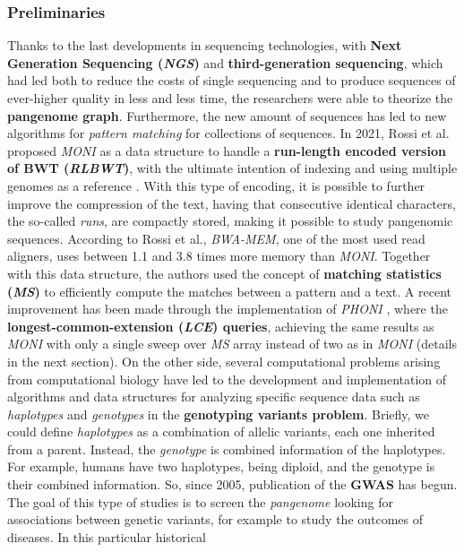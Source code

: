\documentclass[a4paper,11pt, oneside]{article}
\begin{document}
\subsubsection*{Preliminaries}
Thanks to the last developments in sequencing technologies, with \textbf{Next
  Generation Sequencing (\textit{NGS})} and \textbf{third-generation
  sequencing}, which had led both to reduce the costs of single sequencing and
to produce sequences of ever-higher quality in less and less time, the
researchers were able to theorize the \textbf{pangenome graph}. Furthermore, the
new amount of sequences has led to new algorithms for \textit{pattern matching}
for collections of sequences. In 2021, Rossi et al. proposed \textit{MONI} as a
data structure to handle a \textbf{run-length encoded version of BWT
  (\textit{RLBWT})}, with the ultimate intention of indexing and using multiple
genomes as a reference \cite{moni}. With this type of encoding, it is possible
to further improve the compression of the text, having that consecutive
identical characters, the so-called \textit{runs}, are compactly stored, making
it possible to study pangenomic sequences. According to Rossi et al.,
\textit{BWA-MEM}, one of the most used read aligners, uses between 1.1 and 3.8
times more memory than \textit{MONI}. Together with this data structure, the
authors used the concept of \textbf{matching statistics (\textit{MS})}
to efficiently compute the matches between a pattern and a text. A recent
improvement has been made through the implementation of \textit{PHONI}
\cite{phoni}, where the \textbf{longest-common-extension (\textit{LCE})
  queries}, achieving the same results as \textit{MONI} with only a single sweep
over \textit{MS} array instead of two as in \textit{MONI} (details in the next
section). 
On the other side, several computational problems arising from computational
biology have led to the development and implementation of algorithms and data
structures for analyzing specific sequence data such as \textit{haplotypes} and
\textit{genotypes} in the \textbf{genotyping variants problem}. Briefly, we
could define \textit{haplotypes} as a combination of allelic variants, each one
inherited from a parent. Instead, the \textit{genotype} is combined information
of the haplotypes. For example, humans have two haplotypes, being diploid, and
the genotype is their combined information. So, since 2005, publication of the
\textbf{GWAS} has begun. The goal of this type of studies is to screen the
\textit{pangenome} looking for associations between genetic variants, for
example to study the outcomes of diseases.  In this particular historical
\end{document}
